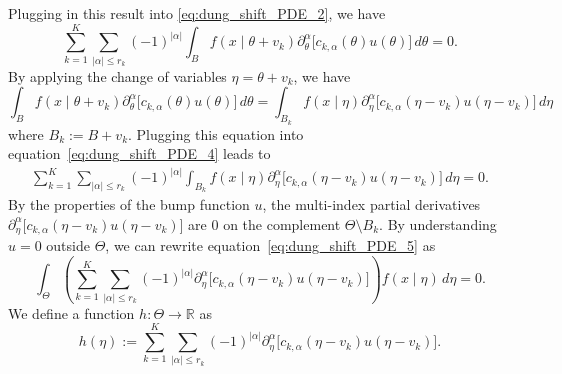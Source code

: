\documentclass[11pt,twoside]{article} %
\begin{document}
Plugging in this result into  \eqref{eq:dung_shift_PDE_2}, we have 
\begin{equation}
\label{eq:dung_shift_PDE_4}
    \sum_{k=1}^K \sum_{|\alpha| \le r_k} (-1)^{|\alpha|} \int_B f(x\mid \theta + v_k) \partial_\theta^\alpha \big[ c_{k, \alpha}(\theta) u(\theta) \big] \, d\theta = 0.
\end{equation}
By applying the change of variables $\eta = \theta + v_k$, we have
$$\int_B f(x \mid \theta + v_k) \partial_\theta^\alpha \big[ c_{k, \alpha}(\theta) u(\theta) \big] \, d\theta = \int_{B_k} f(x \mid \eta) \partial_\eta^\alpha \big[ c_{k, \alpha}(\eta - v_k) u(\eta - v_k) \big] \, d\eta$$
where $B_k := B + v_k$. Plugging this equation into equation~\eqref{eq:dung_shift_PDE_4} leads to
\begin{align}
\sum_{k=1}^K \sum_{|\alpha| \le r_k} (-1)^{|\alpha|} \int_{B_k} f(x\mid \eta) \partial_\eta^\alpha \big[ c_{k, \alpha}(\eta - v_k) u(\eta - v_k) \big] \, d\eta = 0. \label{eq:dung_shift_PDE_5}
\end{align}
By the properties of the bump function $u$, the multi-index partial derivatives $\partial_\eta^\alpha \big[ c_{k, \alpha}(\eta - v_k) u(\eta - v_k) \big]$ are 0 on the complement $\Theta \setminus B_k$. By understanding $u=0$ outside $\Theta$, we can rewrite equation~\eqref{eq:dung_shift_PDE_5} as
$$\int_\Theta \left( \sum_{k=1}^K \sum_{|\alpha| \le r_k} (-1)^{|\alpha|} \partial_\eta^\alpha \big[ c_{k, \alpha}(\eta - v_k) u(\eta - v_k) \big] \right) f(x\mid \eta) \, d\eta = 0.$$
We define a function $h: \Theta \to \mathbb{R}$ as 
$$h(\eta) := \sum_{k=1}^K \sum_{|\alpha| \le r_k} (-1)^{|\alpha|} \partial_\eta^\alpha \big[ c_{k, \alpha}(\eta - v_k) u(\eta - v_k) \big].$$
\end{document}
